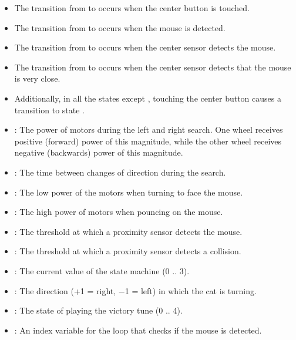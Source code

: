 \begin{itemize}

\item The transition from  to  occurs when
the center button is touched.

\item The transition from  to  occurs
when the mouse is detected.

\item The transition from  to  occurs
when the center sensor detects the mouse.

\item The transition from  to  occurs
when the center sensor detects that the mouse is very close.

\item Additionally, in all the states except , touching the
center button causes a transition to state .
\end{itemize}


\begin{itemize}

\item {}: The power of motors during the left and right search.
One wheel receives positive (forward) power of this magnitude, while the
other wheel receives negative (backwards) power of this magnitude.

\item {}: The time between changes of direction during the search.
\item {}: The low power of the motors when turning to face the mouse.
\item {}: The high power of motors when pouncing on the mouse.
\item {}: The threshold at which a proximity sensor detects the mouse.
\item {}: The threshold at which a proximity sensor detects a collision.
\end{itemize}


\begin{itemize}
\item {}: The current value of the state machine (0 .. 3). 
\item {}: The direction (+1 = right, $-$1 = left) in which the cat is turning.
\item {}: The state of playing the victory tune (0 .. 4).
\item {}: An index variable for the loop that checks if the mouse is detected.

\end{itemize}

